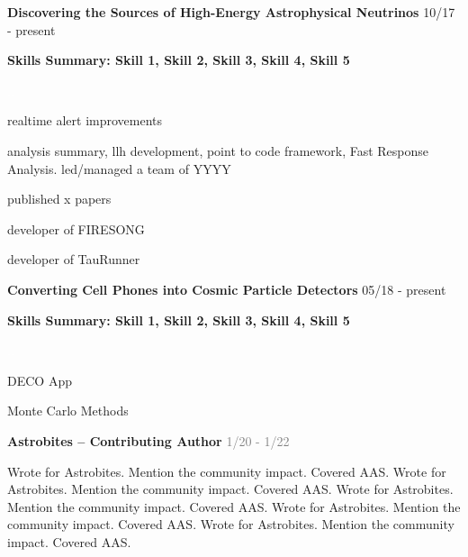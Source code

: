 \vspace{-0.2cm}
\begin{cventries}
  \cventry
    {\textbf{Discovering the Sources of High-Energy Astrophysical Neutrinos}}
    {}
    {}
    {10/17 - present}
    {
    \begin{cvitems}
      \vspace{-0.1cm}
      \textbf{Skills Summary: \textcolor{mydarkblue}{Skill 1},  
      \textcolor{mydarkblue}{Skill 2}, \textcolor{mydarkblue}{Skill 3}, \textcolor{mydarkblue}{Skill 4}, \textcolor{mydarkblue}{Skill 5}}
      \item {\textcolor{white}{..}}
      \vspace{-14pt}
      \item {realtime alert improvements}
      \item {analysis summary, llh development, point to code framework, Fast Response Analysis. led/managed a team of YYYY}
      \item{published x papers}
      \item{developer of FIRESONG}
      \item{developer of TauRunner}
    \end{cvitems}
    }
\vspace{-0.1cm}
  \cventry
    {\textbf{Converting Cell Phones into Cosmic Particle Detectors}}
    {}
    {}
    {05/18 - present}
    {
    \begin{cvitems}
      \vspace{-0.1cm}
      \textbf{Skills Summary: \textcolor{mydarkblue}{Skill 1},  
      \textcolor{mydarkblue}{Skill 2}, \textcolor{mydarkblue}{Skill 3}, \textcolor{mydarkblue}{Skill 4}, \textcolor{mydarkblue}{Skill 5}}
      \item {\textcolor{white}{..}}
      \vspace{-14pt}
      \item {DECO App}
      \item {Monte Carlo Methods}
    \end{cvitems}
    }
    
\end{cventries}


\begin{cventries}
\vspace{-0.15cm}
  \cventry
    {} %
    {\textbf{Astrobites -- Contributing Author}} %
    {\textcolor{gray}{\scriptsize 1/20 - 1/22}} %
    {} %
    {
      \begin{cvitems} %
      \vspace{-0.5cm}
        \item {Wrote for Astrobites. Mention the community impact. Covered AAS. Wrote for Astrobites. Mention the community impact. Covered AAS. Wrote for Astrobites. Mention the community impact. Covered AAS. Wrote for Astrobites. Mention the community impact. Covered AAS. Wrote for Astrobites. Mention the community impact. Covered AAS.}
      \end{cvitems}
    }
\end{cventries}

